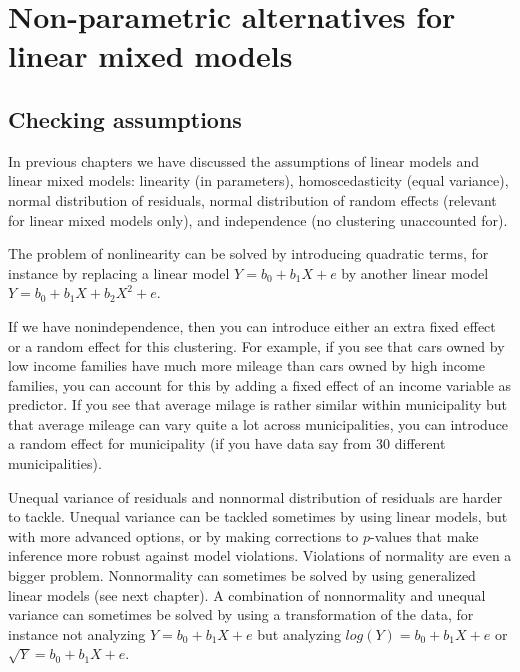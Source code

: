 \chapter{Non-parametric alternatives for linear mixed models}\label{chap:nonpar2}


\section{Checking assumptions}

In previous chapters we have discussed the assumptions of linear models and linear mixed models: linearity (in parameters), homoscedasticity (equal variance), normal distribution of residuals, normal distribution of random effects (relevant for linear mixed models only), and independence (no clustering unaccounted for). 




The problem of nonlinearity can be solved by introducing quadratic terms, for instance by replacing a linear model $Y = b_0 + b_1 X + e$ by another linear model $Y = b_0 + b_1 X + b_2 X^2 + e$.

If we have nonindependence, then you can introduce either an extra fixed effect or a random effect for this clustering. For example, if you see that cars owned by low income families have much more mileage than cars owned by high income families, you can account for this by adding a fixed effect of an income variable as predictor. If you see that average milage is rather similar within municipality but that average mileage can vary quite a lot across municipalities, you can introduce a random effect for municipality (if you have data say from 30 different municipalities). 

Unequal variance of residuals and nonnormal distribution of residuals are harder to tackle. Unequal variance can be tackled sometimes by using linear models, but with more advanced options, or by making corrections to $p$-values that make inference more robust against model violations. Violations of normality are even a bigger problem. Nonnormality can sometimes be solved by using generalized linear models (see next chapter). A combination of nonnormality and unequal variance can sometimes be solved by using a transformation of the data, for instance not analyzing $Y = b_0 + b_1 X + e$ but analyzing $log(Y)=  b_0 + b_1 X + e$ or $\sqrt{Y}=  b_0 + b_1 X + e$.

